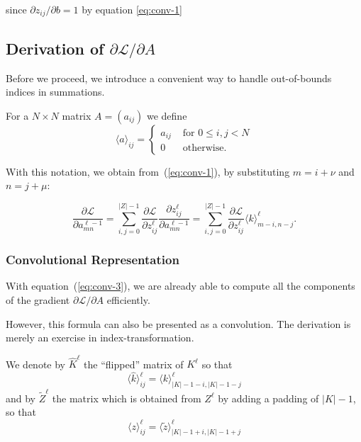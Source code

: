 \documentclass[a4paper,10pt]{article}
\def\Loss{\mathcal{L}}
\begin{document}
since $\partial z_{ij} / \partial b = 1$ by equation \ref{eq:conv-1}

\subsection*{Derivation of $\partial \Loss / \partial A$}

\def\ov#1{\langle{#1}\rangle}

Before we proceed, we introduce a convenient way to handle out-of-bounds indices in summations. 

For a $N \times N$ matrix $A = (a_{ij})$ we define
\[
   \ov a_{ij} = \left\{ 
        \begin{array}{ll} 
            a_{ij} &\text{ for }0 \le i,j < N \\
            0      &\text{ otherwise}.
        \end{array}
        \right.   
\]
 
With this notation, we obtain from~(\ref{eq:conv-1}), by substituting $m=i +\nu$ and $n = j + \mu$: 

\begin{equation}
    \label{eq:conv-3}
    \boxed{
        \frac{\partial \Loss}{\partial a^{\ell-1}_{mn}} = 
        \sum_{i,j =0 }^{|Z|-1} \frac{\partial \Loss}{\partial z_{ij}^\ell} 
        \frac{\partial z_{ij}^\ell}{\partial a_{mn}^{\ell-1}} = 
        \sum_{i,j = 0}^{|Z|-1} \frac{\partial \Loss}{\partial z_{ij}^\ell} \ov{k}_{m-i, n-j}^{\ell}.
        }
\end{equation}

\subsubsection*{Convolutional Representation}

\def\flip#1{\widehat{#1}}
\def\pad#1{\widetilde{#1}}


With equation~(\ref{eq:conv-3}), we are already able to compute all the
components of the gradient $\partial \Loss / \partial A$ efficiently.

However, this formula can also be presented as a convolution. The derivation is
merely an exercise in index-transformation.

We denote by $\flip K^\ell$ the ``flipped'' matrix of $K^\ell$ so that 
\[
    \ov{\flip{k}}^\ell_{ij} = \ov{k}^\ell_{|K|-1-i, |K|-1-j}
\]
and by $\pad Z^\ell $ the matrix which is obtained from $Z^\ell$ by adding
a padding of $|K|-1$, so that
\[
    \ov{z}_{ij}^\ell = \ov{\pad{z}}^\ell_{|K|-1+i, |K|-1+j}
\]
\end{document}
